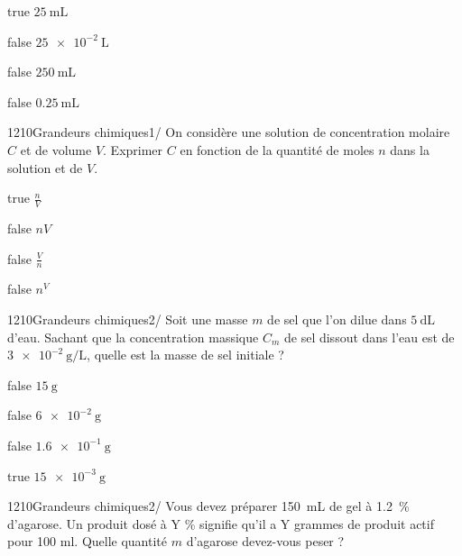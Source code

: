             \begin{reponses}
            	\item[true]  $\SI{25}{\milli\liter} $
            	\item[false]  $ \SI{25e-2}{\liter} $
                \item[false]   $ \SI{250}{\milli\liter} $
                \item[false]  $ \SI{0.25}{\milli\liter} $
            \end{reponses}
        	\begin{question}{1210}{Grandeurs chimiques}{1}{/}
				On considère une solution de concentration molaire $C$ et de volume $V$. Exprimer $C$ en fonction de la quantité de moles $n$ dans la solution et de  $V$. 
            \end{question}
            \begin{reponses}
            	\item[true]  $\frac{n}{V}$
            	\item[false] $ n V$
                \item[false] $ \frac{V}{n}$
                \item[false] $ n^{V}$
            \end{reponses}
            \begin{question}{1210}{Grandeurs chimiques}{2}{/}
				Soit une masse $m$ de sel que l'on dilue dans $\SI{5}{\deci\liter}$ d'eau. Sachant que la concentration massique $C_m$ de sel dissout dans l'eau est de $\SI{3e-2}{\gram\per\liter}$, quelle est la masse de sel initiale ?  
            \end{question}
            \begin{reponses}
            	\item[false] $\SI{15}{\gram}$
            	\item[false] $\SI{6e-2}{\gram}$
                \item[false] $\SI{1,6e-1}{\gram}$
                \item[true]  $\SI{15e-3}{\gram}$
            \end{reponses}
            \begin{question}{1210}{Grandeurs chimiques}{2}{/}
				  Vous devez préparer \SI{150}{mL} de gel à \SI{1.2}{\percent} d’agarose. Un produit dosé à Y \% signifie qu'il a Y grammes de produit actif pour 100 ml. Quelle quantité $m$ d’agarose devez-vous peser ?
            \end{question}
